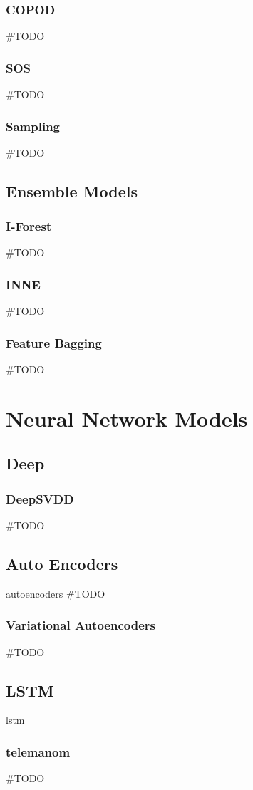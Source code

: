 \subsubsection{COPOD}
\#TODO
\subsubsection{SOS}
\#TODO
\subsubsection{Sampling}
\#TODO

\subsection{Ensemble Models}
\subsubsection{I-Forest}
\#TODO
\subsubsection{INNE}
\#TODO
\subsubsection{Feature Bagging}
\#TODO

\section{Neural Network Models}
\subsection{Deep}
\subsubsection{DeepSVDD}
\#TODO
\subsection{Auto Encoders}
autoencoders
\#TODO
\subsubsection{Variational Autoencoders}
\#TODO
\subsection{LSTM}
lstm
\subsubsection{telemanom}
\#TODO
